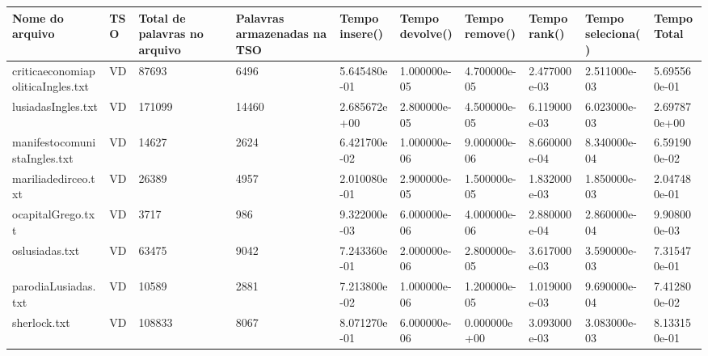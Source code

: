 \begin{tabular}{|l|l|l|l|l|l|l|l|l|l|}
\hline
Nome do arquivo&TSO&Total de palavras no arquivo&Palavras armazenadas na TSO&Tempo insere()&Tempo devolve()&Tempo remove()&Tempo rank()&Tempo seleciona()&Tempo Total\\
\hline
criticaeconomiapoliticaIngles.txt&VD&87693&6496&5.645480e-01&1.000000e-05&4.700000e-05&2.477000e-03&2.511000e-03&5.695560e-01\\
\hline
lusiadasIngles.txt&VD&171099&14460&2.685672e+00&2.800000e-05&4.500000e-05&6.119000e-03&6.023000e-03&2.697870e+00\\
\hline
manifestocomunistaIngles.txt&VD&14627&2624&6.421700e-02&1.000000e-06&9.000000e-06&8.660000e-04&8.340000e-04&6.591900e-02\\
\hline
mariliadedirceo.txt&VD&26389&4957&2.010080e-01&2.900000e-05&1.500000e-05&1.832000e-03&1.850000e-03&2.047480e-01\\
\hline
ocapitalGrego.txt&VD&3717&986&9.322000e-03&6.000000e-06&4.000000e-06&2.880000e-04&2.860000e-04&9.908000e-03\\
\hline
oslusiadas.txt&VD&63475&9042&7.243360e-01&2.000000e-06&2.800000e-05&3.617000e-03&3.590000e-03&7.315470e-01\\
\hline
parodiaLusiadas.txt&VD&10589&2881&7.213800e-02&1.000000e-06&1.200000e-05&1.019000e-03&9.690000e-04&7.412800e-02\\
\hline
sherlock.txt&VD&108833&8067&8.071270e-01&6.000000e-06&0.000000e+00&3.093000e-03&3.083000e-03&8.133150e-01\\
\hline
\end{tabular}